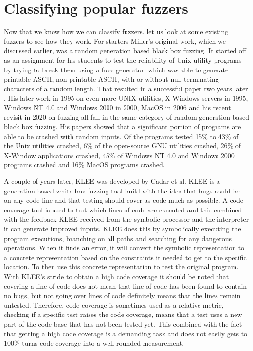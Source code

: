 \section{Classifying popular fuzzers}
\label{fuzzing:OtherFuzzers}
Now that we know how we can classify fuzzers, let us look at some existing fuzzers to see how they work. For starters Miller's original work, which we discussed earlier, was a random generation based black box fuzzing. It started off as an assignment for his students to test the reliability of Unix utility programs by trying to break them using a fuzz generator, which was able to generate printable ASCII, non-printable ASCII, with or without null terminating characters of a random length. That resulted in a successful paper two years later \cite{4originalFuzzingUnixUtils}. His later work in 1995 on even more UNIX utilities, X-Windows servers \cite{26miller1995fuzzrevisited} in 1995, Windows NT 4.0 and Windows 2000 \cite{24MillerWindows} in 2000, MacOS \cite{25MillerOnMacOS} in 2006 and his recent revisit in 2020 on fuzzing \cite{3miller2020relevanceOfClasicalFuzzTesting} all fall in the same category of random generation based black box fuzzing. His papers showed that a significant portion of programs are able to be crashed with random inputs. Of the programs tested 15\% to 43\% of the Unix utilities crashed, 6\% of the open-source GNU utilities crashed, 26\% of X-Window applications crashed, 45\% of Windows NT 4.0 and Windows 2000 programs crashed and 16\% MacOS programs crashed.

A couple of years later, KLEE \cite{8KLEE} was developed by Cadar et al. KLEE is a generation based white box fuzzing tool build with the idea that bugs could be on any code line and that testing should cover as code much as possible. A code coverage tool is used to test which lines of code are executed and this combined with the feedback KLEE received from the symbolic processor and the interpreter it can generate improved inputs. KLEE does this by symbolically executing the program executions, branching on all paths and searching for any dangerous operations. When it finds an error, it will convert the symbolic representation to a concrete representation based on the constraints it needed to get to the specific location. To then use this concrete representation to test the original program.
With KLEE's stride to obtain a high code coverage it should be noted that covering a line of code does not mean that line of code has been found to contain no bugs, but not going over lines of code definitely means that the lines remain untested. Therefore, code coverage is sometimes used as a relative metric, checking if a specific test raises the code coverage, means that a test uses a new part of the code base that has not been tested yet. This combined with the fact that getting a high code coverage is a demanding task and does not easily gets to 100\% turns code coverage into a well-rounded measurement.

